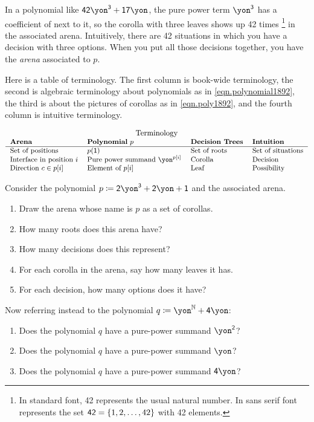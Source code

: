 \documentclass[DynamicalBook]{subfiles}
\begin{document}
In a polynomial like $\4\2\yon^\3+\1\7\yon$, the pure power term $\yon^\3$ has a coefficient of \4\2 next to it, so the corolla with three leaves shows up 42 times%
\footnote{
In standard font, 42 represents the usual natural number. In sans serif font \4\2 represents the set $\textsf{4}\textsf{2}=\{1,2,\ldots,42\}$ with 42 elements.
}
in the associated arena. Intuitively, there are 42 situations in which you have a decision with three options. When you put all those decisions together, you have the \emph{arena} associated to $p$. 

Here is a table of terminology. The first column is book-wide terminology, the second is algebraic terminology about polynomials as in \eqref{eqn.polynomial1892}, the third is about the pictures of corollas as in \eqref{eqn.poly1892}, and the fourth column is intuitive terminology.

\begin{equation}\label{eqn.table_terminology}
\small
\begin{tabular}{llll}
\multicolumn{4}{c}{\normalsize Terminology}\\
\textbf{Arena} & \textbf{Polynomial} $p$ & \textbf{Decision Trees} & \textbf{Intuition}\\\hline
Set of positions & $p(\1)$ & Set of roots & Set of situations\\
Interface in position $i$ & Pure power summand $\yon^{p[i]}$ & Corolla & Decision\\
Direction $c\in p[i]$ & Element of $p[i]$ & Leaf & Possibility
\end{tabular}
\end{equation}


\begin{exercise}
Consider the polynomial $p\coloneqq\2\yon^\3+\2\yon+\1$ and the associated arena.
\begin{enumerate}
	\item Draw the arena whose name is $p$ as a set of corollas.
	\item How many roots does this arena have?
	\item How many decisions does this represent?
	\item For each corolla in the arena, say how many leaves it has.
	\item For each decision, how many options does it have?
\end{enumerate}
Now referring instead to the polynomial $q\coloneqq\yon^\nn+\4\yon$:
\begin{enumerate}[resume]
	\item Does the polynomial $q$ have a pure-power summand $\yon^\2$?
	\item Does the polynomial $q$ have a pure-power summand $\yon$?
	\item Does the polynomial $q$ have a pure-power summand $\4\yon$?
	\qedhere
\end{enumerate}

\end{exercise}
\end{document}

